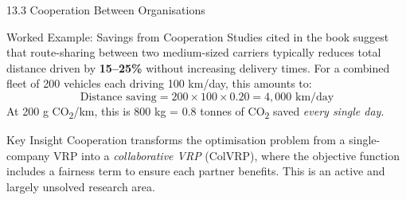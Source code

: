 \documentclass[aspectratio=169,10pt]{beamer}
\begin{document}
\begin{frame}[allowframebreaks]{13.3 Cooperation Between Organisations}
  \bigskip
  \begin{exampleblock}{Worked Example: Savings from Cooperation}
    Studies cited in the book suggest that route-sharing between
    two medium-sized carriers typically reduces total distance
    driven by \textbf{15--25\%} without increasing delivery times.
    For a combined fleet of 200 vehicles each driving 100 km/day,
    this amounts to:
    \[
      \text{Distance saving} = 200 \times 100 \times 0.20 = 4{,}000 \text{ km/day}
    \]
    At 200 g CO\textsubscript{2}/km, this is 800 kg = 0.8 tonnes of
    CO\textsubscript{2} saved \emph{every single day}.
  \end{exampleblock}

  \bigskip
  \begin{alertblock}{Key Insight}
    Cooperation transforms the optimisation problem from a
    single-company VRP into a \emph{collaborative VRP} (ColVRP),
    where the objective function includes a fairness term
    to ensure each partner benefits.  This is an active and
    largely unsolved research area.
  \end{alertblock}

\end{frame}
\end{document}

